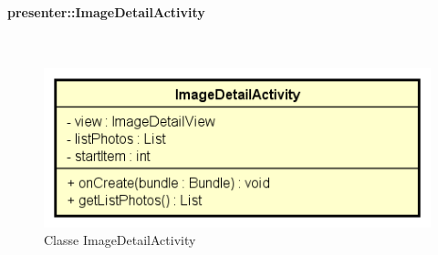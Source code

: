 \documentclass[../DefinizioneDiProdotto.tex]{subfiles}
\begin{document}
\paragraph{presenter::ImageDetailActivity}
\
\begin{figure}[H]
	\centering
	\includegraphics[width=\maxwidth]{img/ImageDetailActivity.png}
	\caption{Classe ImageDetailActivity}\label{fig:presenter::ImageDetailActivity} 
\end{figure}
\end{document}
